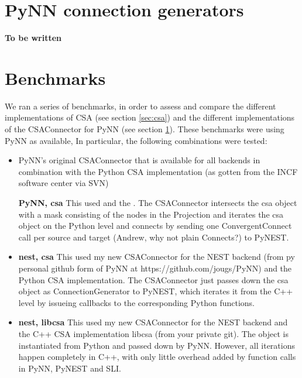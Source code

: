 \documentclass{frontiersSCNS} %
\newcommand{\tbw}[1]{{\bf\parindent0pt\color{red}#1}}
\begin{document}

\section{PyNN connection generators}\label{sec:conn_gen_pynn}
\tbw{To be written}


\section{Benchmarks}\label{sec:benchmarks}

We ran a series of benchmarks, in order to assess and compare the
different implementations of CSA (see section \ref{sec:csa}) and the
different implementations of the CSAConnector for PyNN (see section
\ref{sec:conn_gen_pynn}). These benchmarks were using PyNN as
available, In particular, the following combinations were tested:

\begin{itemize}
\item PyNN's original CSAConnector that is available for all backends
  in combination with the Python CSA implementation (as gotten from
  the INCF software center via SVN)

\textbf{PyNN, csa} This used  and
  the . The CSAConnector intersects the csa object with a
  mask consisting of the nodes in the Projection and iterates the csa
  object on the Python level and connects by sending one
  ConvergentConnect call per source and target (Andrew, why not plain
  Connects?) to PyNEST.
\item \textbf{nest, csa} This used my new CSAConnector for the NEST
  backend (from py personal github form of PyNN at
  https://github.com/jougs/PyNN) and the Python CSA
  implementation. The CSAConnector just passes down the csa object as
  ConnectionGenerator to PyNEST, which iterates it from the C++ level
  by issueing callbacks to the corresponding Python functions.
\item \textbf{nest, libcsa} This used my new CSAConnector for the NEST
  backend and the C++ CSA implementation libcsa (from your private
  git). The object is instantiated from Python and passed down by
  PyNN. However, all iterations happen completely in C++, with only
  little overhead added by function calls in PyNN, PyNEST and SLI.
\end{itemize}
\end{document}
